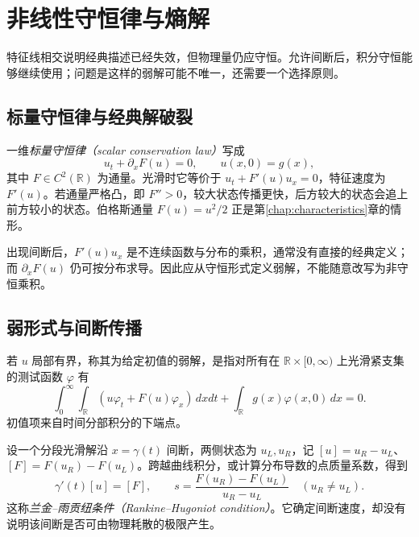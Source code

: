 \setcounter{chapter}{15} %
\chapter{非线性守恒律与熵解}
\label{chap:conservation}

特征线相交说明经典描述已经失效，但物理量仍应守恒。允许间断后，积分守恒能够继续使用；问题是这样的弱解可能不唯一，还需要一个选择原则。

\section{标量守恒律与经典解破裂}
一维\emph{标量守恒律（scalar conservation law）}写成
\begin{equation}
 u_t+\partial_xF(u)=0,\qquad u(x,0)=g(x),
 \label{eq:scalar-conservation}
\end{equation}
其中 $F\in C^2(\mathbb R)$ 为通量。光滑时它等价于 $u_t+F'(u)u_x=0$，特征速度为 $F'(u)$。若通量严格凸，即 $F''>0$，较大状态传播更快，后方较大的状态会追上前方较小的状态。伯格斯通量 $F(u)=u^2/2$ 正是第\ref{chap:characteristics}章的情形。

出现间断后，$F'(u)u_x$ 是不连续函数与分布的乘积，通常没有直接的经典定义；而 $\partial_xF(u)$ 仍可按分布求导。因此应从守恒形式定义弱解，不能随意改写为非守恒乘积。

\section{弱形式与间断传播}
若 $u$ 局部有界，称其为给定初值的弱解，是指对所有在 $\mathbb R\times[0,\infty)$ 上光滑紧支集的测试函数 $\varphi$ 有
\begin{equation}
 \int_0^\infty\int_{\mathbb R}(u\varphi_t+F(u)\varphi_x)\,dxdt
 +\int_{\mathbb R}g(x)\varphi(x,0)\,dx=0.
 \label{eq:conservation-weak}
\end{equation}
初值项来自时间分部积分的下端点。

设一个分段光滑解沿 $x=\gamma(t)$ 间断，两侧状态为 $u_L,u_R$，记 $[u]=u_R-u_L$、$[F]=F(u_R)-F(u_L)$。跨越曲线积分，或计算分布导数的点质量系数，得到
\begin{equation}
 \gamma'(t)[u]=[F],\qquad
 s=\frac{F(u_R)-F(u_L)}{u_R-u_L}\quad(u_R\ne u_L).
 \label{eq:rankine-hugoniot}
\end{equation}
这称\emph{兰金--雨贡纽条件（Rankine--Hugoniot condition）}。它确定间断速度，却没有说明该间断是否可由物理耗散的极限产生。

